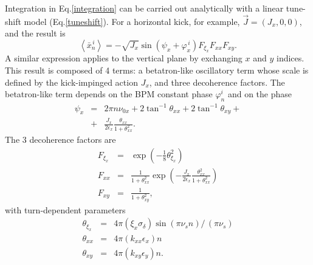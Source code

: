 \documentclass[a4paper,
               keeplastbox,   %
               ]{jacow}
\begin{document}
Integration in Eq.\ref{integration} can be carried out analytically\cite{laurent} with a linear tune-shift model (Eq.\ref{tuneshift}). For a horizontal kick, for example, $\vec{J} = (J_x,0,0)$, and the result is
\begin{equation}
    \left< \bar{x}_n^{\,i} \right> = - \sqrt{J_x} \sin \left( \psi_x + \varphi_x^{\,i}\right) F_{\xi_x} F_{xx} F_{xy} .
\end{equation}
A similar expression applies to the vertical plane by exchanging $x$ and $y$ indices. This result is composed of 4 terms: a betatron-like oscillatory term whose scale is defined by the kick-impinged action $J_x$, and three decoherence factors. The betatron-like term depends on the BPM constant phase $\varphi^i_n$ and on the phase 
\begin{eqnarray}
    \psi_x & = & 2\pi n \nu_{0x} + 2 \tan^{-1} \theta_{xx} + 2 \tan^{-1} \theta_{xy} + \\
           & + & \frac{J_x}{2\epsilon_x} \frac{\theta_{xx}}{1 + \theta^2_{xx}}. \nonumber
\end{eqnarray}
The 3 decoherence factors are
\begin{eqnarray}
    \label{decoh}
    F_{\xi_x} & = & \exp \left( - \frac{1}{8} \theta^{2}_{\xi_x} \right) \nonumber \\
    F_{xx}    & = & \frac{1}{1 + \theta^{2}_{xx}} \exp \left( - \frac{J_x}{2\epsilon_x}  \frac{\theta^{2}_{xx}}{1 + \theta^{2}_{xx}} \right)  \\
    F_{xy}    & = & \frac{1}{1 + \theta^{2}_{xy}}, \nonumber
\end{eqnarray}
with turn-dependent parameters
\begin{eqnarray}
    \label{parameters}
    \theta_{\xi_x} & = & 4\pi \left( \xi_x\sigma_\delta \right) \sin\left( \pi \nu_s n \right) / \, (\pi \nu_s) \nonumber \\
    \theta_{xx}    & = & 4\pi \left( k_{xx}\epsilon_x \right) n \\
    \theta_{xy}    & = & 4\pi \left( k_{xy}\epsilon_y \right) n. \nonumber 
\end{eqnarray}
\end{document}
